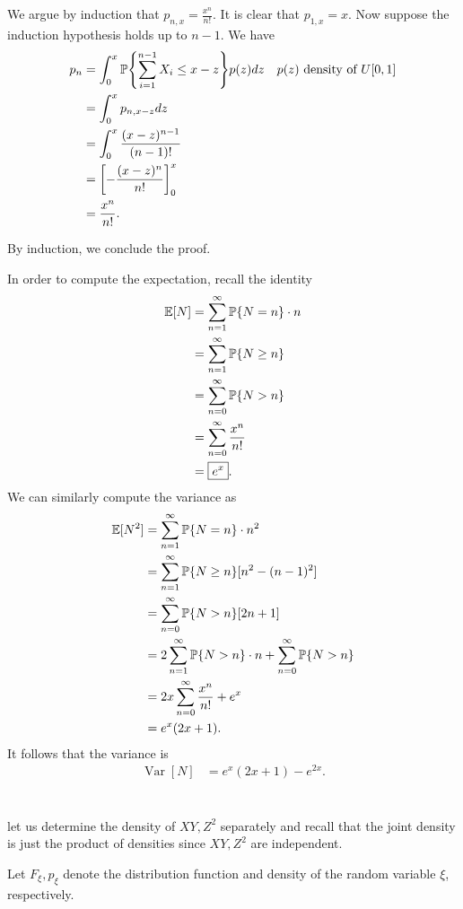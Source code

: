 \documentclass[10pt]{article}
\DeclarePairedDelimiter{\set}{\lbrace}{\rbrace}
\DeclareMathOperator{\Var}{Var}
\newcommand{\E}{\mathbb{E}}
\renewcommand{\P}{\mathbb{P}}
\begin{document}
We argue by induction that $p_{n, x} = \frac{x^n}{n!}$.
It is clear that $p_{1, x} = x$.
Now suppose the induction hypothesis holds up to $n-1$.
We have
\begin{align*}
  p_n
  &= \int_0^x \P\set*{\sum_{i=1}^{n-1} X_i\leq x-z} p(z) dz &&\text{$p(z)$ density of $U[0, 1]$} \\
  &= \int_0^x p_{n, x-z} dz \\
  &= \int_0^x \frac{(x-z)^{n-1}}{(n-1)!} \\
  &= \left[ -\frac{(x-z)^n}{n!} \right]_0^x \\
  &= \frac{x^n}{n!}.
\end{align*}

By induction,
we conclude the proof.

In order to compute the expectation,
recall the identity
\begin{align*}
  \E[N]
  &= \sum_{n=1}^\infty \P\set{N = n}\cdot n \\
  &= \sum_{n=1}^\infty \P\set{N\geq n} \\
  &= \sum_{n=0}^\infty \P\set{N > n} \\
  &= \sum_{n=0}^\infty \frac{x^n}{n!} \\
  &= \boxed{e^x}.
\end{align*}
We can similarly compute the variance as
\begin{align*}
  \E[N^2]
  &= \sum_{n=1}^\infty \P\set{N = n}\cdot n^2 \\
  &= \sum_{n=1}^\infty \P\set{N\geq n} [n^2 - (n-1)^2] \\
  &= \sum_{n=0}^\infty \P\set{N > n} [2n+1] \\
  &= 2 \sum_{n=1}^\infty \P\set{N > n}\cdot n + \sum_{n=0}^\infty \P\set{N>n} \\
  &= 2x \sum_{n=0}^\infty \frac{x^n}{n!} + e^x \\
  &= e^x(2x+1).
\end{align*}
It follows that the variance is
\begin{align*}
  \Var[N]
  &= \boxed{e^x(2x+1) - e^{2x}}.
\end{align*}

\clearpage
\section{}
let us determine the density of $XY, Z^2$ separately
and recall that the joint density is just the product of densities
since $XY, Z^2$ are independent.

Let $F_{\xi}, p_{\xi}$ denote the distribution function
and density of the random variable $\xi$,
respectively.
\end{document}
